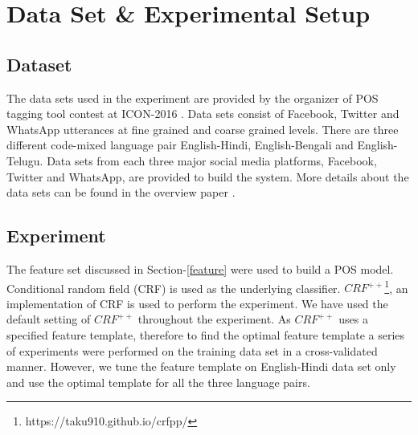 \documentclass[11pt,a4paper]{article}
\begin{document}
\begin{table*}[t]
\centering
{}
\caption{Precision (P), Recall (R) and F-Scores (F) of constrained system, Runs-1 and Run-2 on Coarser grained tag set, Notations are the same as described in Table-2}
\label{table-2}
\end{table*} 
\section{Data Set \& Experimental Setup}
\subsection{Dataset}
The data sets used in the experiment are provided by the organizer of POS tagging tool contest at ICON-2016 \cite{POSicon2016}. Data sets consist of Facebook, Twitter and WhatsApp utterances at fine grained and coarse grained levels. There are three different code-mixed language pair English-Hindi, English-Bengali and English-Telugu. Data sets from each three major social media platforms, Facebook, Twitter and WhatsApp, are provided to build the system. More details about the data sets can be found in the overview paper \cite{POSicon2016}. 
\subsection{Experiment}
The feature set discussed in Section-\ref{feature} were used to build a POS model. Conditional random field (CRF) is used as the underlying classifier. $CRF^{++}$\footnote{https://taku910.github.io/crfpp/}, an implementation of CRF is used to perform the experiment. We have used the default setting of $CRF^{++}$ throughout the experiment. As $CRF^{++}$ uses a specified feature template, therefore to find the optimal feature template a series of experiments were performed on the training data set in a cross-validated manner. However, we tune the feature template on English-Hindi data set only and use the optimal template for all the three language pairs. 
\end{document}

